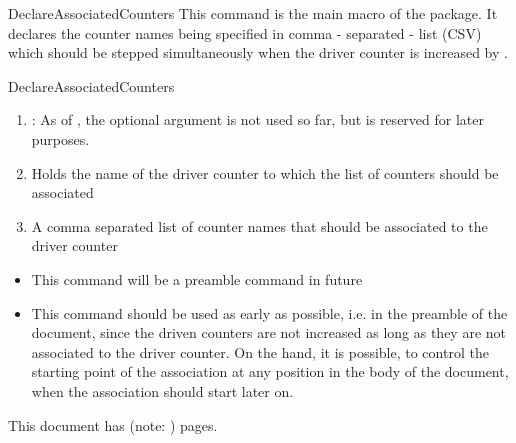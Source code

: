 \documentclass[12pt,paper=a4]{article}
\let\DeclareAssociatedCountersOrig\DeclareAssociatedCounters
\def\packageversion{\assoccntpackageversion}%
\begin{document}
\begin{docCommand}{DeclareAssociatedCounters}{}
This command is the main macro of the package. It declares the counter names being specified in comma - separated - list (CSV) which should be stepped simultaneously when the driver counter is increased by .

\begin{docCommandArgs}{DeclareAssociatedCounters}

\begin{enumerate}[label={\textcolor{blue}{\#\arabic*}}]
  \item {}: As of \packageversion, the optional argument  is not used so far, but is reserved for later purposes.

  \item {} 

    Holds the name of the driver counter to which the list of counters should be associated
\item {}

  A comma separated list of counter names that should be associated to the driver counter
\end{enumerate}
\end{docCommandArgs}


\begin{itemize}
\item This command will be a preamble command in future
\item This command should be used as early as possible, i.e. in the preamble of the document, since the driven counters are not increased as long as they are not associated to the driver counter. On the hand, it is possible, to control the starting point of the association at any position in the body of the document, when the association should start later on. 
\end{itemize}


\renewcommand{\DeclareAssociatedCounters}[3][]{\relax}%
\begin{dispExample}
\DeclareAssociatedCounters{page}{totalpages,anothertotalpages}%
This document has \number{} (note: \number{}) pages.
\end{dispExample}


\end{docCommand}
\end{document}
